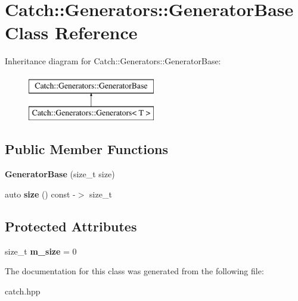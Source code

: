 \hypertarget{class_catch_1_1_generators_1_1_generator_base}{}\section{Catch\+:\+:Generators\+:\+:Generator\+Base Class Reference}
\label{class_catch_1_1_generators_1_1_generator_base}
Inheritance diagram for Catch\+:\+:Generators\+:\+:Generator\+Base\+:\begin{figure}[H]
\begin{center}
\leavevmode
\includegraphics[height=2.000000cm]{class_catch_1_1_generators_1_1_generator_base}
\end{center}
\end{figure}
\subsection*{Public Member Functions}
\begin{DoxyCompactItemize}
\item 
\mbox{\label{class_catch_1_1_generators_1_1_generator_base_ab003974d458a14acfb48f79e7e8abe21}} 
{\bfseries Generator\+Base} (size\+\_\+t size)
\item 
\mbox{\label{class_catch_1_1_generators_1_1_generator_base_a2fb4a5c153f3fdc2708245b40751b487}} 
auto {\bfseries size} () const -\/$>$ size\+\_\+t
\end{DoxyCompactItemize}
\subsection*{Protected Attributes}
\begin{DoxyCompactItemize}
\item 
\mbox{\label{class_catch_1_1_generators_1_1_generator_base_ac6ab90adfdda9401e2ea03db5b2dfc6a}} 
size\+\_\+t {\bfseries m\+\_\+size} = 0
\end{DoxyCompactItemize}


The documentation for this class was generated from the following file\+:\begin{DoxyCompactItemize}
\item 
catch.\+hpp\end{DoxyCompactItemize}
